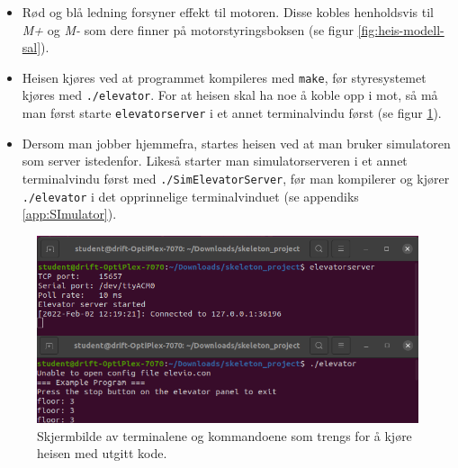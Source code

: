 \begin{alphasection}
\begin{itemize}
    \item Rød og blå ledning forsyner effekt til motoren. Disse kobles henholdsvis til \textit{M+} og \textit{M-} som dere finner på motorstyringsboksen (se figur \ref{fig:heis-modell-sal}).
    \item Heisen kjøres ved at programmet kompileres med \verb|make|, før styresystemet kjøres med \verb|./elevator|. For at heisen skal ha noe å koble opp i mot, så må man først starte  \verb|elevatorserver|  i et annet terminalvindu først (se figur \ref{fig:terminal-oppstart-heis}).
    \item Dersom man jobber hjemmefra, startes heisen ved at man bruker simulatoren som server istedenfor. Likeså starter man simulatorserveren i et annet terminalvindu først med \verb|./SimElevatorServer|, før man kompilerer og kjører \verb|./elevator| i det opprinnelige terminalvinduet (se appendiks \ref{app:SImulator}).
\end{itemize}

\begin{figure}[ht]
    \centering
    \includegraphics[scale=0.65]{figures/terminal-heis.png}
    \caption{Skjermbilde av terminalene og kommandoene som trengs for å kjøre heisen med utgitt kode.}
    \label{fig:terminal-oppstart-heis}
\end{figure}




\end{alphasection}
